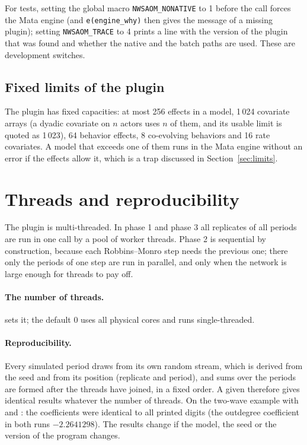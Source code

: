 For tests, setting the global macro \texttt{NWSAOM\_NONATIVE} to 1 before the call forces the Mata engine (and \texttt{e(engine\_why)} then gives the message of a missing plugin); setting \texttt{NWSAOM\_TRACE} to 4 prints a line with the version of the plugin that was found and whether the native and the batch paths are used. These are development switches.

\subsection{Fixed limits of the plugin}

The plugin has fixed capacities: at most 256 effects in a model, 1\,024 covariate arrays (a dyadic covariate on $n$ actors uses $n$ of them, and its usable limit is quoted as 1\,023), 64 behavior effects, 8 co-evolving behaviors and 16 rate covariates. A model that exceeds one of them runs in the Mata engine without an error if the effects allow it, which is a trap discussed in Section~\ref{sec:limits}.

\section{Threads and reproducibility}\label{sec:threads}

The plugin is multi-threaded. In phase 1 and phase 3 all replicates of all periods are run in one call by a pool of worker threads. Phase 2 is sequential by construction, because each Robbins--Monro step needs the previous one; there only the periods of one step are run in parallel, and only when the network is large enough for threads to pay off.

\paragraph{The number of threads.}  sets it; the default 0 uses all physical cores and  runs single-threaded.

\paragraph{Reproducibility.} Every simulated period draws from its own random stream, which is derived from the seed and from its position (replicate and period), and sums over the periods are formed after the threads have joined, in a fixed order. A given  therefore gives identical results whatever the number of threads. On the two-wave example with  and : the coefficients were identical to all printed digits (the outdegree coefficient in both runs $-2.2641298$). The results change if the model, the seed or the version of the program changes.

